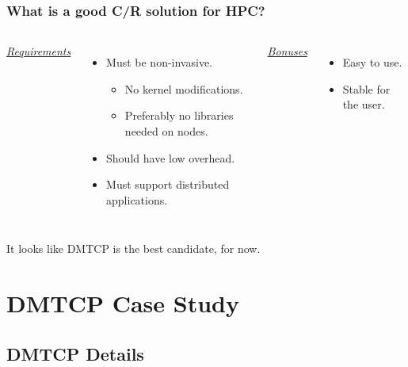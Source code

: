 \documentclass[compress]{beamer}
\begin{document}
\begin{frame}
\frametitle{What is a good C/R solution for HPC?}

\begin{columns}[t]
\ul{\textit{Requirements}}
\begin{itemize}
\item Must be non-invasive.
  \begin{itemize}
  \item No kernel modifications.
  \item Preferably no libraries needed on nodes.
  \end{itemize}
\item Should have low overhead.
\item Must support distributed applications.
\end{itemize}

\ul{\textit{Bonuses}}
\begin{itemize}
\item Easy to use.
\item Stable for the user.
\end{itemize}

\end{columns}

\vspace{2ex}
It looks like DMTCP is the best candidate, for now.




\end{frame}



\section{DMTCP Case Study}    %

\subsection{DMTCP Details}    %
\end{document}
